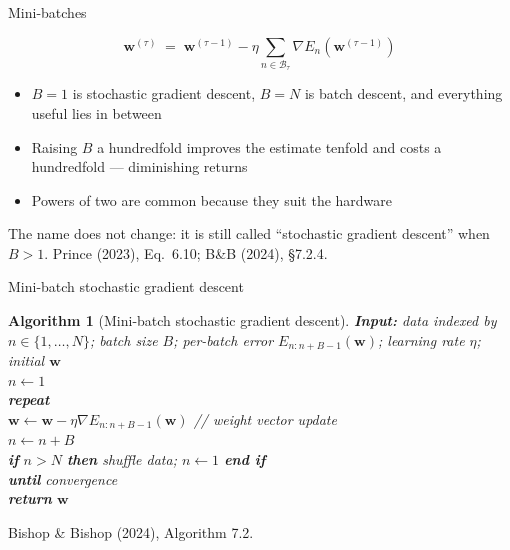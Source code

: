\documentclass[aspectratio=169, 11pt]{beamer}
\newtheorem{algox}[theorem]{Algorithm}
\newcommand{\srcline}[1]{%
  \par\vspace{0.25em}%
  {\scriptsize\color{mcMuted}\hfill #1\par}}
\newcommand{\figsource}[1]{{\scriptsize\color{mcMuted} #1}}
\newcommand{\src}[3]{}      %
\begin{document}
\begin{frame}{Mini-batches}
  \src{prince2023}{equation}{6.10}
  \src{prince2023}{section}{6.2.1}
  \src{bishop2024}{section}{7.2.4}
  \vspace{-0.35em}
  \[
    \mathbf{w}^{(\tau)} \;=\; \mathbf{w}^{(\tau-1)}
      - \eta \sum_{n \in \mathcal{B}_\tau}
        \nabla E_n\!\left(\mathbf{w}^{(\tau-1)}\right)
  \]
  \vspace{-0.7em}
  \begin{itemize}\itemsep0.35em
    \item $B = 1$ is stochastic gradient descent, $B = N$ is batch
          descent, and everything useful lies in between
    \item Raising $B$ a hundredfold improves the estimate tenfold and
          costs a hundredfold --- \alert{diminishing returns}
    \item Powers of two are common because they suit the hardware
  \end{itemize}
  \begin{redhighlight}
    The name does not change: it is still called ``stochastic gradient
    descent'' when $B > 1$.
    \figsource{Prince (2023), Eq.~6.10; B\&B (2024), \S7.2.4.}
  \end{redhighlight}
\end{frame}

\begin{frame}{Mini-batch stochastic gradient descent}
  \src{bishop2024}{algorithm}{7.2}
  \src{bishop2024}{section}{7.2.4}
  \vspace{0.2em}
  \begin{algox}[Mini-batch stochastic gradient descent]\label{th:msgd}
    \small
    \textbf{Input:} data indexed by $n \in \{1,\dots,N\}$; batch size
    $B$; per-batch error $E_{n:n+B-1}(\mathbf{w})$; learning rate $\eta$;
    initial $\mathbf{w}$\\[0.35em]
    $n \leftarrow 1$\\
    \textbf{repeat}\\
    \hspace{1.4em} $\mathbf{w} \leftarrow \mathbf{w} - \eta \nabla E_{n:n+B-1}(\mathbf{w})$
      \hfill \textcolor{mcMuted}{// weight vector update}\\
    \hspace{1.4em} $n \leftarrow n + B$\\
    \hspace{1.4em} \textbf{if} $n > N$ \textbf{then}
      \; shuffle data; \; $n \leftarrow 1$ \; \textbf{end if}\\
    \textbf{until} convergence\\
    \textbf{return} $\mathbf{w}$
  \end{algox}
  \srcline{Bishop \& Bishop (2024), Algorithm 7.2.}
\end{frame}
\end{document}
